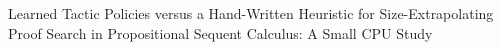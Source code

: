 Learned Tactic Policies versus a Hand-Written Heuristic for Size-Extrapolating Proof Search in Propositional Sequent Calculus: A Small CPU Study
